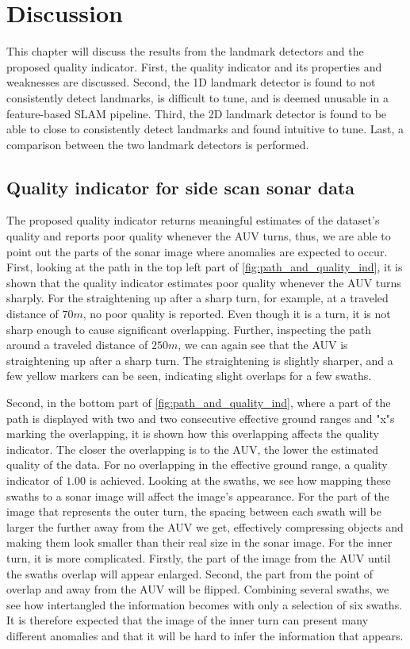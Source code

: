 \chapter{Discussion}

This chapter will discuss the results from the landmark detectors and the proposed quality indicator. First, the quality indicator and its properties and weaknesses are discussed. Second, the 1D landmark detector is found to not consistently detect landmarks, is difficult to tune, and is deemed unusable in a feature-based SLAM pipeline. Third, the 2D landmark detector is found to be able to close to consistently detect landmarks and found intuitive to tune. Last, a comparison between the two landmark detectors is performed. 

\section{Quality indicator for side scan sonar data}

The proposed quality indicator returns meaningful estimates of the dataset's quality and reports poor quality whenever the AUV turns, thus, we are able to point out the parts of the sonar image where anomalies are expected to occur. First, looking at the path in the top left part of \cref{fig:path_and_quality_ind}, it is shown that the quality indicator estimates poor quality whenever the AUV turns sharply. For the straightening up after a sharp turn, for example, at a traveled distance of $70 m$, no poor quality is reported. Even though it is a turn, it is not sharp enough to cause significant overlapping. Further, inspecting the path around a traveled distance of $250 m$, we can again see that the AUV is straightening up after a sharp turn. The straightening is slightly sharper, and a few yellow markers can be seen, indicating slight overlaps for a few swaths. 

Second, in the bottom part of \cref{fig:path_and_quality_ind}, where a part of the path is displayed with two and two consecutive effective ground ranges and "x"s marking the overlapping, it is shown how this overlapping affects the quality indicator. The closer the overlapping is to the AUV, the lower the estimated quality of the data. For no overlapping in the effective ground range, a quality indicator of $1.00$ is achieved. Looking at the swaths, we see how mapping these swaths to a sonar image will affect the image's appearance. For the part of the image that represents the outer turn, the spacing between each swath will be larger the further away from the AUV we get, effectively compressing objects and making them look smaller than their real size in the sonar image. For the inner turn, it is more complicated. Firstly, the part of the image from the AUV until the swaths overlap will appear enlarged. Second, the part from the point of overlap and away from the AUV will be flipped. Combining several swaths, we see how intertangled the information becomes with only a selection of six swaths. It is therefore expected that the image of the inner turn can present many different anomalies and that it will be hard to infer the information that appears. 

